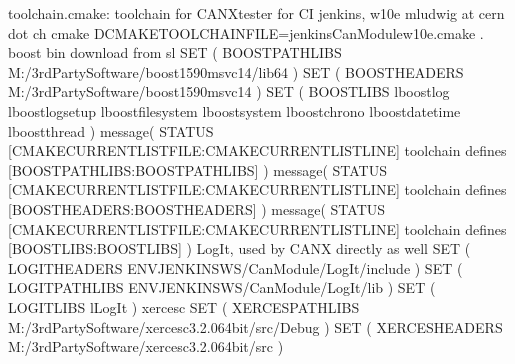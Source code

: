 \documentclass[letterpaper,10pt,english]{sphinxmanual}
\begin{document}
\begin{sphinxVerbatim}[commandchars=\\\{\}]
toolchain.cmake:
\PYGZhy{}\PYGZhy{}\PYGZhy{}\PYGZhy{}\PYGZhy{}\PYGZhy{}\PYGZhy{}\PYGZhy{}\PYGZhy{}\PYGZhy{}\PYGZhy{}\PYGZhy{}\PYGZhy{}\PYGZhy{}\PYGZhy{}\PYGZhy{}
\PYGZsh{} toolchain for CANX\PYGZhy{}tester for CI jenkins, w10e
\PYGZsh{} mludwig at cern dot ch
\PYGZsh{} cmake \PYGZhy{}DCMAKE\PYGZus{}TOOLCHAIN\PYGZus{}FILE=jenkins\PYGZus{}CanModule\PYGZus{}w10e.cmake .
\PYGZsh{}
\PYGZsh{} boost
\PYGZsh{}
\PYGZsh{} bin download from sl
SET ( BOOST\PYGZus{}PATH\PYGZus{}LIBS \PYGZdq{}M:/3rdPartySoftware/boost\PYGZus{}1\PYGZus{}59\PYGZus{}0\PYGZhy{}msvc\PYGZhy{}14/lib64\PYGZdq{} )
SET ( BOOST\PYGZus{}HEADERS \PYGZdq{}M:/3rdPartySoftware/boost\PYGZus{}1\PYGZus{}59\PYGZus{}0\PYGZhy{}msvc\PYGZhy{}14\PYGZdq{} )
SET ( BOOST\PYGZus{}LIBS \PYGZhy{}lboost\PYGZus{}log \PYGZhy{}lboost\PYGZus{}log\PYGZus{}setup \PYGZhy{}lboost\PYGZus{}filesystem \PYGZhy{}lboost\PYGZus{}system \PYGZhy{}lboost\PYGZus{}chrono \PYGZhy{}lboost\PYGZus{}date\PYGZus{}time \PYGZhy{}lboost\PYGZus{}thread  )
message( STATUS \PYGZdq{}[\PYGZdl{}\PYGZob{}CMAKE\PYGZus{}CURRENT\PYGZus{}LIST\PYGZus{}FILE\PYGZcb{}:\PYGZdl{}\PYGZob{}CMAKE\PYGZus{}CURRENT\PYGZus{}LIST\PYGZus{}LINE\PYGZcb{}] toolchain defines [BOOST\PYGZus{}PATH\PYGZus{}LIBS:\PYGZdl{}\PYGZob{}BOOST\PYGZus{}PATH\PYGZus{}LIBS\PYGZcb{}]\PYGZdq{} )
message( STATUS \PYGZdq{}[\PYGZdl{}\PYGZob{}CMAKE\PYGZus{}CURRENT\PYGZus{}LIST\PYGZus{}FILE\PYGZcb{}:\PYGZdl{}\PYGZob{}CMAKE\PYGZus{}CURRENT\PYGZus{}LIST\PYGZus{}LINE\PYGZcb{}] toolchain defines [BOOST\PYGZus{}HEADERS:\PYGZdl{}\PYGZob{}BOOST\PYGZus{}HEADERS\PYGZcb{}]\PYGZdq{} )
message( STATUS \PYGZdq{}[\PYGZdl{}\PYGZob{}CMAKE\PYGZus{}CURRENT\PYGZus{}LIST\PYGZus{}FILE\PYGZcb{}:\PYGZdl{}\PYGZob{}CMAKE\PYGZus{}CURRENT\PYGZus{}LIST\PYGZus{}LINE\PYGZcb{}] toolchain defines [BOOST\PYGZus{}LIBS:\PYGZdl{}\PYGZob{}BOOST\PYGZus{}LIBS\PYGZcb{}]\PYGZdq{} )
\PYGZsh{}
\PYGZsh{} LogIt, used by CANX directly as well
\PYGZsh{}
SET ( LOGIT\PYGZus{}HEADERS   \PYGZdq{}\PYGZdl{}ENV\PYGZob{}JENKINSWS\PYGZcb{}/CanModule/LogIt/include\PYGZdq{} )
SET ( LOGIT\PYGZus{}PATH\PYGZus{}LIBS \PYGZdq{}\PYGZdl{}ENV\PYGZob{}JENKINSWS\PYGZcb{}/CanModule/LogIt/lib\PYGZdq{} )
SET ( LOGIT\PYGZus{}LIBS \PYGZdq{}\PYGZhy{}lLogIt\PYGZdq{} )
\PYGZsh{}
\PYGZsh{} xerces\PYGZhy{}c
\PYGZsh{}
SET ( XERCES\PYGZus{}PATH\PYGZus{}LIBS \PYGZdq{}M:/3rdPartySoftware/xerces\PYGZhy{}c\PYGZhy{}3.2.0\PYGZus{}64bit/src/Debug\PYGZdq{} )
SET ( XERCES\PYGZus{}HEADERS \PYGZdq{}M:/3rdPartySoftware/xerces\PYGZhy{}c\PYGZhy{}3.2.0\PYGZus{}64bit/src\PYGZdq{} )

\end{sphinxVerbatim}
\end{document}
